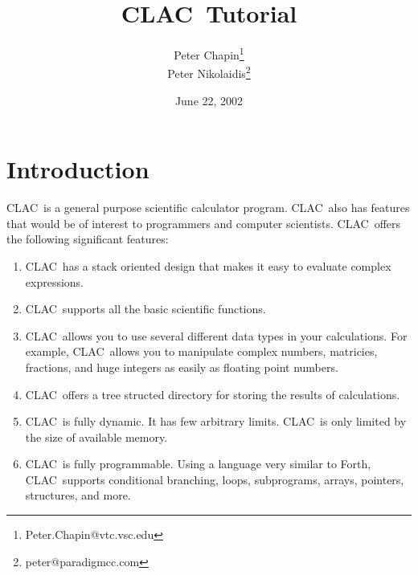 \documentclass{report}
\newcommand{\CLAC}{CLAC}
\begin{document}
\title{\CLAC\ Tutorial}
\author{Peter Chapin\thanks{Peter.Chapin@vtc.vsc.edu}\\
        Peter Nikolaidis\thanks{peter@paradigmcc.com}}
\date{June 22, 2002}
\maketitle

\tableofcontents
\newpage
{}

\chapter{Introduction}

\CLAC\ is a general purpose scientific calculator program. \CLAC\ also has features that would be of interest to programmers and computer scientists. \CLAC\ offers the following significant features:

\begin{enumerate}
  
\item \CLAC\ has a stack oriented design that makes it easy to evaluate complex expressions.
  
\item \CLAC\ supports all the basic scientific functions.
  
\item \CLAC\ allows you to use several different data types in your calculations. For example, \CLAC\ allows you to manipulate complex numbers, matricies, fractions, and huge integers as easily as floating point numbers.
  
\item \CLAC\ offers a tree structed directory for storing the results of calculations.
  
\item \CLAC\ is fully dynamic. It has few arbitrary limits. \CLAC\ is only limited by the size of available memory.
  
\item \CLAC\ is fully programmable. Using a language very similar to Forth, \CLAC\ supports conditional branching, loops, subprograms, arrays, pointers, structures, and more.

\end{enumerate}
\end{document}
